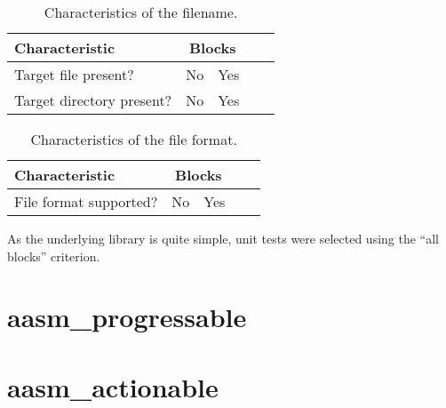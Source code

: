 \documentclass[document.tex]{subfiles}
\begin{document}
\begin{table}[!htbp]
  \centering
  \caption{Characteristics of the filename.}
  \label{tbl:platform-test-cases-aasm_statecharts-filename-xtics}

  \vspace{3mm}
  \begin{tabular}{l *{3}{c} c}
    \hline
    Characteristic & \multicolumn{2}{c}{Blocks} \\
    \hline
    Target file present? & No & Yes \\
    Target directory present? & No & Yes \\
    \hline
  \end{tabular}
\end{table}

\begin{table}[!htbp]
  \centering
  \caption{Characteristics of the file format.}
  \label{tbl:platform-test-cases-aasm_statecharts-format-xtics}

  \vspace{3mm}
  \begin{tabular}{l *{3}{c} c}
    \hline
    Characteristic & \multicolumn{2}{c}{Blocks} \\
    \hline
    File format supported? & No & Yes \\
    \hline
  \end{tabular}
\end{table}

As the underlying library is quite simple, unit tests were selected using the ``all blocks'' criterion. 

\FloatBarrier

\section {aasm\_progressable}

\section {aasm\_actionable}
\end{document}
